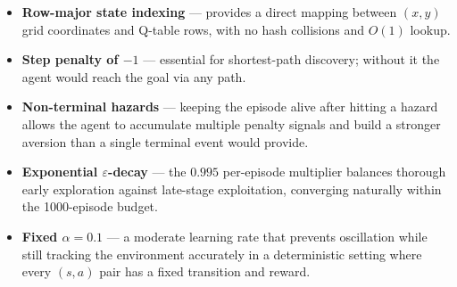 \documentclass[12pt]{article}
\begin{document}
\begin{itemize}
    \item \textbf{Row-major state indexing} --- provides a direct mapping
          between $(x,y)$ grid coordinates and Q-table rows, with no
          hash collisions and $O(1)$ lookup.
    \item \textbf{Step penalty of $-1$} --- essential for shortest-path
          discovery; without it the agent would reach the goal via any path.
    \item \textbf{Non-terminal hazards} --- keeping the episode alive after
          hitting a hazard allows the agent to accumulate multiple penalty
          signals and build a stronger aversion than a single terminal event
          would provide.
    \item \textbf{Exponential $\varepsilon$-decay} --- the $0.995$ per-episode
          multiplier balances thorough early exploration against late-stage
          exploitation, converging naturally within the 1000-episode budget.
    \item \textbf{Fixed $\alpha = 0.1$} --- a moderate learning rate that
          prevents oscillation while still tracking the environment accurately
          in a deterministic setting where every $(s,a)$ pair has a fixed
          transition and reward.
\end{itemize}
\end{document}
